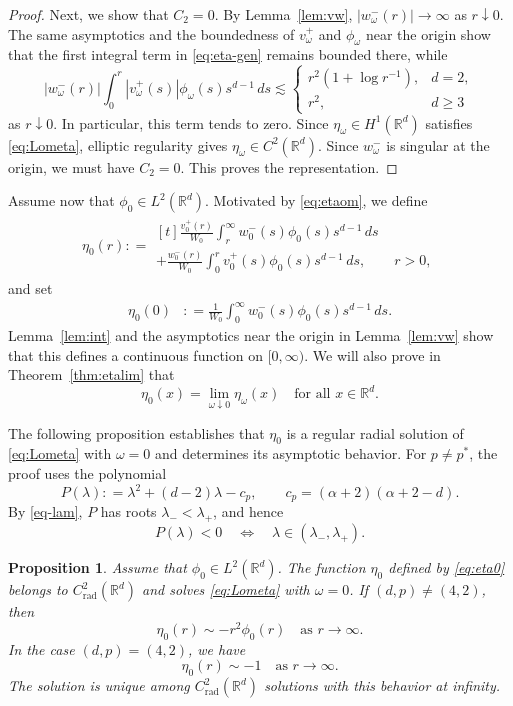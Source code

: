 \documentclass[12pt, a4paper, reqno]{amsart}
\numberwithin{equation}{section}
\newtheorem{proposition}[theorem]{Proposition}
\theoremstyle{definition}
\theoremstyle{remark}
\newcommand{\R}{\mathbb R}
\newcommand{\rad}{\mathrm{rad}}
\newcommand{\ce}{\mathrel{\mathop:}=}
\begin{document}
\begin{proof}
Next, we show that $C_2=0$. By Lemma~\ref{lem:vw},
$|w_\omega^-(r)|\to\infty$ as $r\downarrow0$. The same asymptotics and
the boundedness of $v_\omega^+$ and $\phi_\omega$ near the origin
show that the first integral term in \eqref{eq:eta-gen} remains
bounded there, while
\[
  |w_\omega^-(r)|
  \int_0^r |v_\omega^+(s)|\phi_\omega(s)s^{d-1}\,ds
  \lesssim
  \begin{cases}
    r^2(1+\log r^{-1}), & d=2,\\
    r^2, & d\ge3
  \end{cases}
\]
as $r\downarrow0$. In particular, this term tends to zero.
Since $\eta_\omega\in H^1(\R^d)$ satisfies \eqref{eq:Lometa},
elliptic regularity gives $\eta_\omega\in C^2(\R^d)$. Since $w_\omega^-$ is singular at the origin, we must have $C_2=0$.
This proves the representation.
\end{proof}

Assume now that $\phi_0\in L^2(\R^d)$. Motivated by
\eqref{eq:etaom}, we define
\begin{align}\label{eq:eta0}
    \eta_0(r)
    \ce \begin{multlined}[t]
    \frac{v_0^+(r)}{W_0}
    \int_r^\infty w_0^-(s)\phi_0(s)s^{d-1}\,ds
\\  +\frac{w_0^-(r)}{W_0}
    \int_0^r v_0^+(s)\phi_0(s)s^{d-1}\,ds,
    \qquad r>0,
    \end{multlined}
\end{align}
and set
\begin{align*}
 \eta_0(0)&\ce
  \frac1{W_0}\int_0^\infty w_0^-(s)\phi_0(s)s^{d-1}\,ds.
\end{align*}
Lemma~\ref{lem:int} and the asymptotics near the origin in
Lemma~\ref{lem:vw} show that this defines a continuous function on
$[0,\infty)$.
We will also prove in Theorem~\ref{thm:etalim} that
\[
  \eta_0(x)=\lim_{\omega\downarrow0}\eta_\omega(x)
  \quad\text{for all }x\in\R^d.
\]

The following proposition establishes that $\eta_0$ is a regular
radial solution of \eqref{eq:Lometa} with $\omega=0$
and determines its asymptotic behavior.
For $p\ne p^*$, the proof uses the polynomial
\[
  P(\lambda)\ce\lambda^2+(d-2)\lambda-c_p,
  \qquad c_p=(\alpha+2)(\alpha+2-d).
\]
By \eqref{eq-lam}, $P$ has roots $\lambda_-<\lambda_+$,
and hence
\[
  P(\lambda)<0
  \quad\Longleftrightarrow\quad
  \lambda\in(\lambda_-,\lambda_+).
\]
\begin{proposition}\label{prop:eta0}
Assume that $\phi_0\in L^2(\R^d)$. The function $\eta_0$ defined by
\eqref{eq:eta0} belongs to $C_{\rad}^2(\R^d)$ and solves \eqref{eq:Lometa} with $\omega=0$. If $(d,p)\ne(4,2)$, then
\begin{equation}\label{eq:eta-dec}
    \eta_0(r)\sim-r^2\phi_0(r)
    \quad\text{as }r\to\infty.
\end{equation}
In the case $(d,p)=(4,2)$, we have
\[
    \eta_0(r)\sim-1
    \quad\text{as }r\to\infty.
\]
The solution is unique among $C_{\rad}^2(\R^d)$ solutions with this
behavior at infinity.
\end{proposition}
\end{document}
